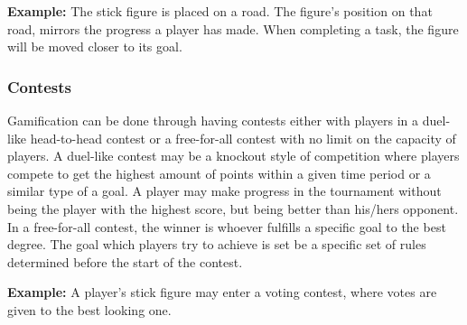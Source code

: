 \textbf{Example:} The stick figure is placed on a road. The figure's position on that road, mirrors the progress a player has made. When completing a task, the figure will be moved closer to its goal.  


\subsubsection{Contests}
Gamification can be done through having contests either with players in a duel-like head-to-head contest or a free-for-all contest with no limit on the capacity of players. A duel-like contest may be a knockout style of competition where players compete to get the highest amount of points within a given time period or a similar type of a goal. A player may make progress in the tournament without being the player with the highest score, but being better than his/hers opponent. In a free-for-all contest, the winner is whoever fulfills a specific goal to the best degree. The goal which players try to achieve is set be a specific set of rules determined before the start of the contest.

\textbf{Example:} A player's stick figure may enter a voting contest, where votes are given to the best looking one.

